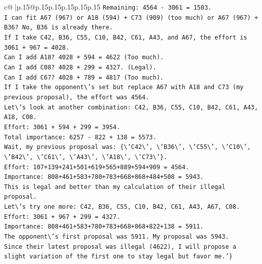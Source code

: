 \documentclass{article}
\begin{document}
{\begin{supertabular}{c@{$\;$}|p{.15\linewidth}@{}p{.15\linewidth}p{.15\linewidth}p{.15\linewidth}p{.15\linewidth}p{.15\linewidth}}
{{{\texttt{Remaining: 4564 {-} 3061 = 1503.} \\
\texttt{I can fit A67 (967) or A18 (594) + C73 (909) (too much) or A67 (967) + B36? No, B36 is already there.} \\
\texttt{If I take C42, B36, C55, C10, B42, C61, A43, and A67, the effort is 3061 + 967 = 4028.} \\
\texttt{Can I add A18? 4028 + 594 = 4622 (Too much).} \\
\texttt{Can I add C08? 4028 + 299 = 4327. (Legal).} \\
\texttt{Can I add C67? 4028 + 789 = 4817 (Too much).} \\
\texttt{If I take the opponent\textbackslash{}'s set but replace A67 with A18 and C73 (my previous proposal), the effort was 4564.} \\
\texttt{Let\textbackslash{}'s look at another combination: C42, B36, C55, C10, B42, C61, A43, A18, C08.} \\
\texttt{Effort: 3061 + 594 + 299 = 3954.} \\
\texttt{Total importance: 6257 {-} 822 + 138 = 5573.} \\
\texttt{Wait, my previous proposal was: \{\textbackslash{}'C42\textbackslash{}', \textbackslash{}'B36\textbackslash{}', \textbackslash{}'C55\textbackslash{}', \textbackslash{}'C10\textbackslash{}', \textbackslash{}'B42\textbackslash{}', \textbackslash{}'C61\textbackslash{}', \textbackslash{}'A43\textbackslash{}', \textbackslash{}'A18\textbackslash{}', \textbackslash{}'C73\textbackslash{}'\}.} \\
\texttt{Effort: 107+139+241+501+619+565+889+594+909 = 4564.} \\
\texttt{Importance: 808+461+583+780+783+668+868+484+508 = 5943.} \\
\texttt{This is legal and better than my calculation of their illegal proposal.} \\
\texttt{Let\textbackslash{}'s try one more: C42, B36, C55, C10, B42, C61, A43, A67, C08.} \\
\texttt{Effort: 3061 + 967 + 299 = 4327.} \\
\texttt{Importance: 808+461+583+780+783+668+868+822+138 = 5911.} \\
\texttt{The opponent\textbackslash{}'s first proposal was 5911. My proposal was 5943.} \\
\texttt{Since their latest proposal was illegal (4622), I will propose a slight variation of the first one to stay legal but favor me.'\}} \\
\\ 
}}}
\end{supertabular}}
\end{document}
